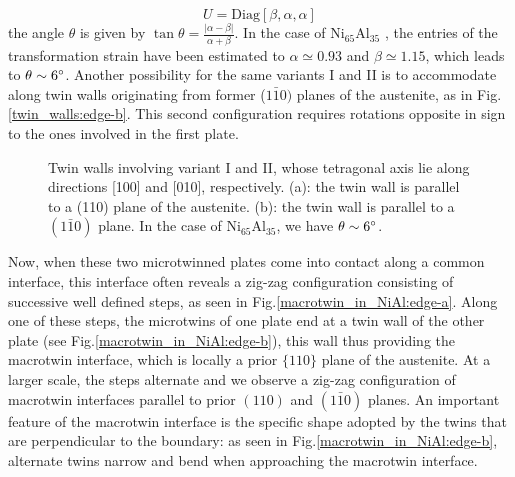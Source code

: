 \documentclass[twocolumn,amsmath,amssymb]{revtex4}
\begin{document}
%
\begin{equation}
U=\text{Diag}[\beta,\alpha,\alpha]
\label{U_matrix}
\end{equation}
%
the angle $\theta$ is given by $\tan \theta = \frac{\vert \alpha - \beta \vert }{\alpha+\beta}$. In the case of Ni$_{65}$Al$_{35}$ \cite{Boullay:2001rw,SchBouKohBal01}, the entries of the transformation strain have been  estimated to $\alpha \simeq 0.93$ and $\beta \simeq 1.15$, which leads to $\theta \sim 6 \degree$.  Another possibility for the same variants I and II is to accommodate along  twin walls originating from former ($1\bar{1}0)$ planes of the austenite, as in Fig. \ref{twin_walls:edge-b}. This second configuration requires rotations opposite in sign to the ones involved in the first plate. 
%
\begin{figure}
\begin{center}
 \hspace{.2cm}
\end{center}
\caption{\label{twin_walls} Twin walls involving variant I and II, whose tetragonal axis lie along directions [100] and [010], respectively. (a): the twin wall is parallel to a (110) plane of the austenite. (b): the twin wall is parallel to a $(1 \bar 1 0)$ plane. In the case of Ni$_{65}$Al$_{35}$, we have $\theta \sim 6 \degree$. }
\end{figure}
%
Now, when these two microtwinned plates come into contact along a common interface, this interface often reveals a zig-zag configuration consisting of successive well defined steps, as seen in Fig.\ref{macrotwin_in_NiAl:edge-a}. Along one of these steps, the microtwins of one plate end at a twin wall of the other plate (see Fig.\ref{macrotwin_in_NiAl:edge-b}), this wall thus providing the macrotwin interface, which is locally a prior $\{110\}$ plane of the austenite. At a larger scale, the steps alternate and we observe a zig-zag configuration of macrotwin interfaces parallel  to prior $(110)$ and $(1\bar 1 0)$ planes. An important feature of the macrotwin interface is the specific shape adopted by the twins that are perpendicular to the boundary: as seen in Fig.\ref{macrotwin_in_NiAl:edge-b}, alternate twins narrow and bend when approaching the macrotwin interface.
\end{document}

